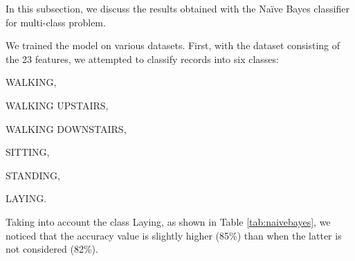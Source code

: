 \documentclass[10pt, a4paper, twocolumn]{article}
\begin{document}
In this subsection, we discuss the results obtained with the Naïve Bayes classifier for multi-class problem.

We trained the model on various datasets. First, with the dataset consisting of the 23 features, we attempted to classify records into six classes:
%
\begin{enumerate*}
    \item WALKING,
    \item WALKING UPSTAIRS,
    \item WALKING DOWNSTAIRS,
    \item SITTING, 
    \item STANDING,
    \item LAYING.
\end{enumerate*}
%
Taking into account the class Laying, as shown in Table \ref{tab:naivebayes}, we noticed that the accuracy value is slightly higher (85\%) than when the latter is not considered (82\%). 
\end{document}
